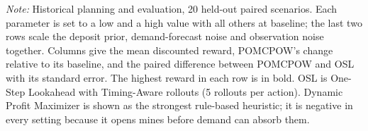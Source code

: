 \begin{table}[H]
{\begin{tabular}{@{}llrrrrrrl@{}}
\bottomrule
\end{tabular}%
}
\par\smallskip
\begin{minipage}{\textwidth}
\footnotesize \textit{Note:} Historical planning and evaluation, 20 held-out paired scenarios. Each parameter is set to a low and a high value with all others at baseline; the last two rows scale the deposit prior, demand-forecast noise and observation noise together. Columns give the mean discounted reward, POMCPOW's change relative to its baseline, and the paired difference between POMCPOW and OSL with its standard error. The highest reward in each row is in bold. OSL is One-Step Lookahead with Timing-Aware rollouts (5 rollouts per action). Dynamic Profit Maximizer is shown as the strongest rule-based heuristic; it is negative in every setting because it opens mines before demand can absorb them.
\end{minipage}
\end{table}
